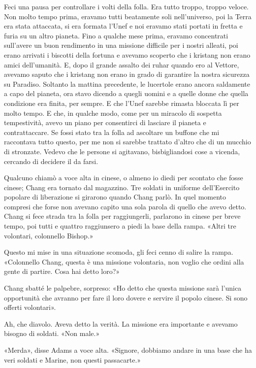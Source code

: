Feci una pausa per controllare i volti della folla. Era tutto troppo,
troppo veloce. Non molto tempo prima, eravamo tutti beatamente soli
nell'universo, poi la Terra era stata attaccata, si era formata l'Unef e
noi eravamo stati portati in fretta e furia su un altro pianeta. Fino a
qualche mese prima, eravamo concentrati sull'avere un buon rendimento in
una missione difficile per i nostri alleati, poi erano arrivati i
biscotti della fortuna e avevamo scoperto che i kristang non erano amici
dell'umanità. E, dopo il grande assalto dei ruhar quando ero al Vettore,
avevamo saputo che i kristang non erano in grado di garantire la nostra
sicurezza su Paradiso. Soltanto la mattina precedente, le lucertole
erano ancora saldamente a capo del pianeta, ora stavo dicendo a quegli
uomini e a quelle donne che quella condizione era finita, per sempre. E
che l'Unef sarebbe rimasta bloccata lì per molto tempo. E che, in
qualche modo, come per un miracolo di sospetta tempestività, avevo un
piano per consentirci di lasciare il pianeta e contrattaccare. Se fossi
stato tra la folla ad ascoltare un buffone che mi raccontava tutto
questo, per me non si sarebbe trattato d'altro che di un mucchio di
stronzate. Vedevo che le persone si agitavano, bisbigliandosi cose a
vicenda, cercando di decidere il da farsi.

Qualcuno chiamò a voce alta in cinese, o almeno io diedi per scontato
che fosse cinese; Chang era tornato dal magazzino. Tre soldati in
uniforme dell'Esercito popolare di liberazione si girarono quando Chang
parlò. In quel momento compresi che forse non avevano capito una sola
parola di quello che avevo detto. Chang si fece strada tra la folla per
raggiungerli, parlarono in cinese per breve tempo, poi tutti e quattro
raggiunsero a piedi la base della rampa. «Altri tre volontari,
colonnello Bishop.»

Questo mi mise in una situazione scomoda, gli feci cenno di salire la
rampa. «Colonnello Chang, questa è una missione volontaria, non voglio
che ordini alla gente di partire. Cosa hai detto loro?»

Chang sbatté le palpebre, sorpreso: «Ho detto che questa missione sarà
l'unica opportunità che avranno per fare il loro dovere e servire il
popolo cinese. Si sono offerti volontari».

Ah, che diavolo. Aveva detto la verità. La missione era importante e
avevamo bisogno di soldati. «Non male.»

«Merda», disse Adams a voce alta. «Signore, dobbiamo andare in una base
che ha veri soldati e Marine, non questi passacarte.»

